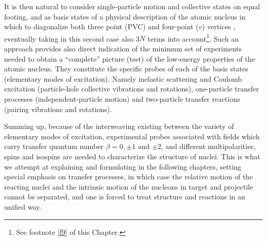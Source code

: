 It is then natural to consider single-particle motion  and collective states on equal footing, and as basis states of a physical description of the atomic nucleus in which to diagonalize both three point  (PVC) and four-point ($v$) vertices , eventually taking in this second case also 3$N$ terms into account\footnote{See footnote \ref{f9} of this Chapter.}. Such an approach  provides also direct indication of the minimum set of experiments needed to obtain a ``complete'' picture (test)  of the low-energy properties  of the atomic nucleus. They constitute the specific probes of each of the basis states (elementary modes of excitation). Namely inelastic scattering and Coulomb excitation (particle-hole collective vibrations and rotations), one-particle transfer processes (independent-particle motion) and two-particle transfer reactions (pairing vibrations and rotations). 


Summing up, because of the interweaving existing between the variety of elementary modes of excitation, experimental probes associated with fields which carry transfer quantum number $\beta=0, \pm 1$ and $\pm2$, and different multipolarities, spins and isospins are needed to characterize the structure of nuclei. This is what we attempt at explaining and formulating in the following chapters, setting special emphasis on transfer processes, in which case the relative motion of the reacting nuclei and the intrinsic motion of the nucleons in target and projectile cannot be separated, and one is forced to treat structure and reactions in an unified way.









%

%
